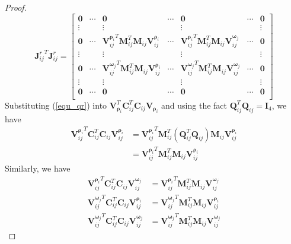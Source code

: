 \documentclass{vgtc}                          %
\begin{document}
\begin{proof}
\begin{equation}
	{\mathbf{J}_{ij}^{r}}^{T}\mathbf{J}_{ij}^{r} = \begin{bmatrix}
	\mathbf{0} & \cdots  & 	\mathbf{0} & \cdots & \mathbf{0} & \cdots & \mathbf{0} \\
	\vdots        &  &  \vdots &  & \vdots &  & \vdots \\
	\mathbf{0} & \cdots  & 	 {\bm{V}^{{\bm{\rho}}_{i}}_{ij}}^{T}\mathbf{M}_{ij}^{T}\mathbf{M}_{ij}\bm{V}^{{\bm{\rho}}_{i}}_{ij} & \cdots &  {\bm{V}^{{\bm{\rho}}_{i}}_{ij}}^{T}\mathbf{M}_{ij}^{T}\mathbf{M}_{ij}\bm{V}^{{\bm{\omega}}_{j}}_{ij} & \cdots & \mathbf{0} \\
	\vdots        &   &  \vdots &  & \vdots &  & \vdots \\
	\mathbf{0} & \cdots  & 	 {\bm{V}^{{\bm{\omega}}_{j}}_{ij}}^{T}\mathbf{M}_{ij}^{T}\mathbf{M}_{ij}\bm{V}^{{\bm{\rho}}_{i}}_{ij} & \cdots &  {\bm{V}^{{\bm{\omega}}_{j}}_{ij}}^{T}\mathbf{M}_{ij}^{T}\mathbf{M}_{ij}\bm{V}^{{\bm{\omega}}_{j}}_{ij} & \cdots & \mathbf{0} \\
	\vdots        &   &  \vdots &  & \vdots &  & \vdots \\
	\mathbf{0} & \cdots  & 	\mathbf{0} & \cdots & \mathbf{0} & \cdots & \mathbf{0} \\
	\end{bmatrix}
	\end{equation}
		Substituting (\ref{equ_qr}) into $	\bm{V}_{{\bm{\rho}}_{i}}^{T}\mathbf{C}_{ij}^{T}\mathbf{C}_{ij}\bm{V}_{{\bm{\rho}}_{i}}$ and using the fact $\mathbf{Q}_{ij}^{T}\mathbf{Q}_{ij} = \mathbf{I}_{4}$, we have 
	\begin{equation} \label{equ_equvalent_1}
		\begin{split}
			{\bm{V}^{{\bm{\rho}}_{i}}_{ij}}^{T}\mathbf{C}_{ij}^{T}\mathbf{C}_{ij}\bm{V}^{{\bm{\rho}}_{i}}_{ij} & = {\bm{V}^{{\bm{\rho}}_{i}}_{ij}}^{T}\mathbf{M}_{ij}^{T}\left( \mathbf{Q}_{ij}^{T}\mathbf{Q}_{ij}\right) \mathbf{M}_{ij}\bm{V}^{{\bm{\rho}}_{i}}_{ij} \\
			 & = {\bm{V}^{{\bm{\rho}}_{i}}_{ij}}^{T}\mathbf{M}_{ij}^{T}\mathbf{M}_{ij}\bm{V}^{{\bm{\rho}}_{i}}_{ij} 
		\end{split}
	\end{equation}
	Similarly, we have 
	\begin{equation} \label{equ_equvalent_2}
		\begin{split}
			{\bm{V}^{{\bm{\rho}}_{i}}_{ij}}^{T}\mathbf{C}_{ij}^{T}\mathbf{C}_{ij}\bm{V}^{{\bm{\omega}}_{j}}_{ij} &= {\bm{V}^{{\bm{\rho}}_{i}}_{ij}}^{T}\mathbf{M}_{ij}^{T}\mathbf{M}_{ij}\bm{V}^{{\bm{\omega}}_{j}}_{ij}  \\
			{\bm{V}^{{\bm{\omega}}_{j}}_{ij}}^{T}\mathbf{C}_{ij}^{T}\mathbf{C}_{ij}\bm{V}^{{\bm{\rho}}_{i}}_{ij} &= {\bm{V}^{{\bm{\omega}}_{j}}_{ij}}^{T}\mathbf{M}_{ij}^{T}\mathbf{M}_{ij}\bm{V}^{{\bm{\rho}}_{i}}_{ij}  \\
			{\bm{V}^{{\bm{\omega}}_{j}}_{ij}}^{T}\mathbf{C}_{ij}^{T}\mathbf{C}_{ij}\bm{V}^{{\bm{\omega}}_{j}}_{ij} &= {\bm{V}^{{\bm{\omega}}_{j}}_{ij}}^{T}\mathbf{M}_{ij}^{T}\mathbf{M}_{ij}\bm{V}^{{\bm{\omega}}_{j}}_{ij} 
		\end{split}
	\end{equation}
	

\end{proof}
\end{document}
